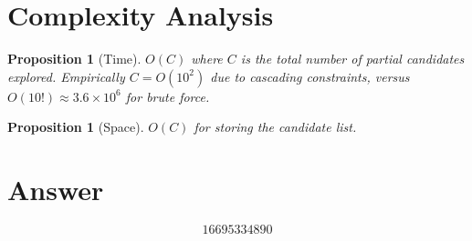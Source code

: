 \documentclass[12pt]{article}
\newtheorem{proposition}[theorem]{Proposition}
\begin{document}
\section{Complexity Analysis}

\begin{proposition}[Time]
$O(C)$ where $C$ is the total number of partial candidates explored. Empirically $C = O(10^2)$ due to cascading constraints, versus $O(10!) \approx 3.6 \times 10^6$ for brute force.
\end{proposition}

\begin{proposition}[Space]
$O(C)$ for storing the candidate list.
\end{proposition}

\section{Answer}

\[
\boxed{16695334890}
\]
\end{document}
